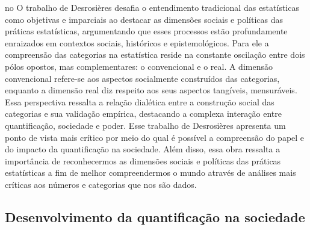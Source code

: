 no
O trabalho de Desrosières desafia o entendimento tradicional das estatísticas como objetivas e imparciais ao destacar as dimensões sociais e políticas das práticas estatísticas, argumentando que esses processos estão profundamente enraizados em contextos sociais, históricos e epistemológicos. Para ele a compreensão das categorias na estatística reside na constante oscilação entre dois pólos opostos, mas complementares: o convencional e o real. A dimensão convencional refere-se aos aspectos socialmente construídos das categorias, enquanto a dimensão real diz respeito aos seus aspectos tangíveis, mensuráveis. Essa perspectiva ressalta a relação dialética entre a construção social das categorias e sua validação empírica, destacando a complexa interação entre quantificação, sociedade e poder. Esse trabalho de Desrosières apresenta um ponto de vista mais crítico por meio do qual é possível a compreensão do papel e do impacto da quantificação na sociedade. Além disso, essa obra ressalta a importância de reconhecermos as dimensões sociais e políticas das práticas estatísticas a fim de melhor compreendermos o mundo através de análises mais críticas aos números e categorias que nos são dados.

\subsection{Desenvolvimento da quantificação na sociedade}

